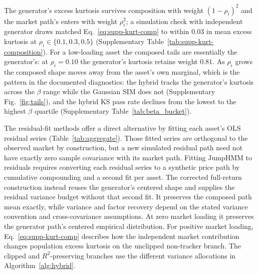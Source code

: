 The generator's excess kurtosis survives composition with weight
$(1 - \rho_i)^2$ and the market path's enters with weight $\rho_i^2$;
a simulation check with independent generator draws matched
Eq.~\eqref{eq:supp-kurt-comp} to within $0.03$ in mean excess
kurtosis at $\rho_i \in \{0.1, 0.3, 0.5\}$
(Supplementary Table~\ref{tab:supp-kurt-composition}). For a low-loading asset
the composed tails are essentially the generator's: at
$\rho_i = 0.10$ the generator's kurtosis retains weight $0.81$. As
$\rho_i$ grows the composed shape moves away from the asset's own
marginal, which is the pattern in the documented diagnostics: the
hybrid tracks the generator's kurtosis across the $\beta$ range while
the Gaussian SIM does not (Supplementary Fig.~\ref{fig:tails}), and the hybrid KS
pass rate declines from the lowest to the highest $\beta$ quartile
(Supplementary Table~\ref{tab:beta_bucket}).

The residual-fit methods offer a direct alternative by fitting each
asset's OLS residual series (Table~\ref{tab:aggregate}). Those fitted
series are orthogonal to the observed market by construction, but a
new simulated residual path need not have exactly zero sample
covariance with its market path. Fitting JumpHMM to residuals requires
converting each residual series to a synthetic price path by
cumulative compounding and a second fit per asset. The corrected
full-return construction instead reuses the generator's centered
shape and supplies the residual variance budget without that second
fit. It preserves the composed path mean exactly, while variance and
factor recovery depend on the stated variance convention and
cross-covariance assumptions. At zero market loading it preserves the
generator path's centered empirical distribution. For positive market
loading, Eq.~\eqref{eq:supp-kurt-comp} describes how the independent
market contribution changes population excess kurtosis on the
unclipped non-tracker branch. The clipped and $R^2$-preserving branches
use the different variance allocations in Algorithm~\ref{alg:hybrid}.

\begin{table}[H]
\centering
\caption{\textbf{Simulation check of the kurtosis composition rule.}
    For each variance share $\rho_i$, $200$ pairs of independent
    in-sample-length generator paths were standardized and combined
    as $\sqrt{\rho_i}\, x + \sqrt{1 - \rho_i}\, y$. The predicted
    column evaluates Eq.~\eqref{eq:supp-kurt-comp} with each pair's
    sample excess kurtosis; the simulated column is the sample excess
    kurtosis of the combined series. Both are averaged over the $200$
    pairs.}
\label{tab:supp-kurt-composition}
\small

\end{table}


